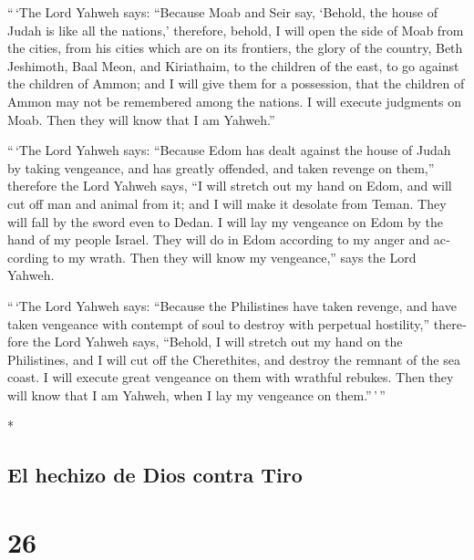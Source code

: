 \begin{paracol}{2}
\begin{otherlanguage}{english}
 ``\,`The Lord Yahweh says: ``Because Moab and Seir say,
`Behold, the house of Judah is like all the nations,' 
therefore, behold, I will open the side of Moab from the cities, from
his cities which are on its frontiers, the glory of the country, Beth
Jeshimoth, Baal Meon, and Kiriathaim,  to the children of
the east, to go against the children of Ammon; and I will give them for
a possession, that the children of Ammon may not be remembered among the
nations.  I will execute judgments on Moab. Then they
will know that I am Yahweh.''

 ``\,`The Lord Yahweh says: ``Because Edom has dealt
against the house of Judah by taking vengeance, and has greatly
offended, and taken revenge on them,''  therefore the
Lord Yahweh says, ``I will stretch out my hand on Edom, and will cut off
man and animal from it; and I will make it desolate from Teman. They
will fall by the sword even to Dedan.  I will lay my
vengeance on Edom by the hand of my people Israel. They will do in Edom
according to my anger and according to my wrath. Then they will know my
vengeance,'' says the Lord Yahweh.

 ``\,`The Lord Yahweh says: ``Because the Philistines
have taken revenge, and have taken vengeance with contempt of soul to
destroy with perpetual hostility,''  therefore the Lord
Yahweh says, ``Behold, I will stretch out my hand on the Philistines,
and I will cut off the Cherethites, and destroy the remnant of the sea
coast.  I will execute great vengeance on them with
wrathful rebukes. Then they will know that I am Yahweh, when I lay my
vengeance on them.''\,'\,''

\end{otherlanguage}

\switchcolumn[0]*

\hypertarget{el-hechizo-de-dios-contra-tiro}{%
\subsection{El hechizo de Dios contra
Tiro}\label{el-hechizo-de-dios-contra-tiro}}

\hypertarget{section-50}{%
\section{26}\label{section-50}}


\end{paracol}
